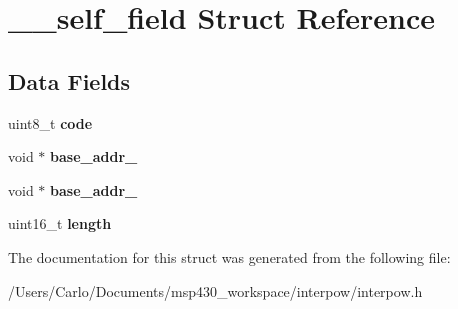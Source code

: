 \hypertarget{struct____self__field}{}\section{\+\_\+\+\_\+self\+\_\+field Struct Reference}
\label{struct____self__field}
\subsection*{Data Fields}
\begin{DoxyCompactItemize}
\item 
\mbox{\label{struct____self__field_a966576744a473fafb7687f8e5649941f}} 
uint8\+\_\+t {\bfseries code}
\item 
\mbox{\label{struct____self__field_aee79e8afe7b475270ab2e852da523b03}} 
void $\ast$ {\bfseries base\+\_\+addr\+\_}
\item 
\mbox{\label{struct____self__field_af5445995f69bd15498a2832373662b7c}} 
void $\ast$ {\bfseries base\+\_\+addr\+\_}
\item 
\mbox{\label{struct____self__field_a1892eba2086d12ac2b09005aeb09ea3b}} 
uint16\+\_\+t {\bfseries length}
\end{DoxyCompactItemize}


The documentation for this struct was generated from the following file\+:\begin{DoxyCompactItemize}
\item 
/\+Users/\+Carlo/\+Documents/msp430\+\_\+workspace/interpow/interpow.\+h\end{DoxyCompactItemize}

